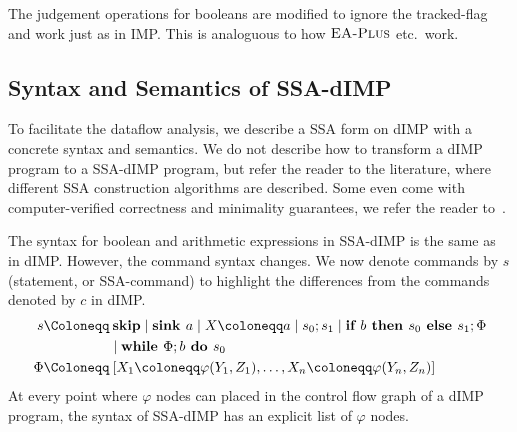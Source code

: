The judgement operations for booleans are modified to ignore the tracked-flag and work
just as in IMP. This is analoguous to how $\textsc{EA-Plus}$ etc.\ work.

\subsection{Syntax and Semantics of SSA-dIMP}
To facilitate the dataflow analysis, we describe a SSA form on dIMP with a concrete
syntax and semantics.
We do not describe how to transform a dIMP program to a SSA-dIMP program, but 
refer the reader to the literature, where different SSA construction algorithms are
described. Some even come with computer-verified correctness and minimality guarantees,
we refer the reader to~\cite{verifiedssa}.

The syntax for boolean and arithmetic expressions in SSA-dIMP is the same as in dIMP.
However, the command syntax changes.
We now denote commands by $s$ (statement, or SSA-command) to highlight the differences
from the commands denoted by $c$ in dIMP.
\begin{align*}
    s \Coloneqq &\:\skipcmd \mid \defaultsink \mid \defaultstore \mid \defaultssaseq 
    \mid \defaultssaif\\
    &\mid \defaultssawhile \\
    \philist \Coloneqq &\: \defaultphilistn\\
\end{align*}
At every point where $\varphi$ nodes can placed in the control flow graph
of a dIMP program, the syntax of SSA-dIMP has an explicit list of $\varphi$ nodes.


